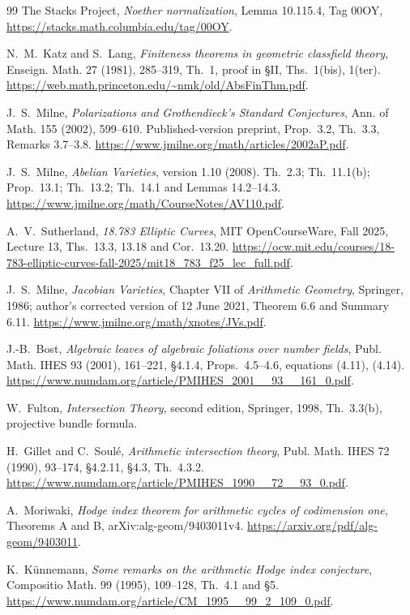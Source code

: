 \documentclass[11pt,a4paper]{article}
\theoremstyle{remark}
\begin{document}
\begin{thebibliography}{99}
The Stacks Project, \emph{Noether normalization}, Lemma 10.115.4,
Tag 00OY, \url{https://stacks.math.columbia.edu/tag/00OY}.

N.~M.~Katz and S.~Lang, \emph{Finiteness theorems in geometric classfield
theory}, Enseign. Math. 27 (1981), 285--319, Th.~1, proof in \S II,
Ths.~1(bis), 1(ter).
\url{https://web.math.princeton.edu/~nmk/old/AbsFinThm.pdf}.

J.~S.~Milne, \emph{Polarizations and Grothendieck's Standard Conjectures},
Ann. of Math. 155 (2002), 599--610. Published-version preprint,
Prop.~3.2, Th.~3.3, Remarks 3.7--3.8.
\url{https://www.jmilne.org/math/articles/2002aP.pdf}.

J.~S.~Milne, \emph{Abelian Varieties}, version 1.10 (2008).
Th.~2.3; Th.~11.1(b); Prop.~13.1; Th.~13.2; Th.~14.1 and
Lemmas 14.2--14.3.
\url{https://www.jmilne.org/math/CourseNotes/AV110.pdf}.

A.~V.~Sutherland, \emph{18.783 Elliptic Curves}, MIT OpenCourseWare,
Fall 2025, Lecture 13, Ths.~13.3, 13.18 and Cor.~13.20.
\url{https://ocw.mit.edu/courses/18-783-elliptic-curves-fall-2025/mit18_783_f25_lec_full.pdf}.

J.~S.~Milne, \emph{Jacobian Varieties}, Chapter VII of
\emph{Arithmetic Geometry}, Springer, 1986; author's corrected version
of 12 June 2021, Theorem 6.6 and Summary 6.11. \url{https://www.jmilne.org/math/xnotes/JVs.pdf}.

J.-B.~Bost, \emph{Algebraic leaves of algebraic foliations over number
fields}, Publ. Math. IHES 93 (2001), 161--221,
\S4.1.4, Props.~4.5--4.6, equations (4.11), (4.14).
\url{https://www.numdam.org/article/PMIHES_2001__93__161_0.pdf}.

W.~Fulton, \emph{Intersection Theory}, second edition, Springer, 1998,
Th.~3.3(b), projective bundle formula.

H.~Gillet and C.~Soul\'e, \emph{Arithmetic intersection theory},
Publ. Math. IHES 72 (1990), 93--174, \S4.2.11, \S4.3,
Th.~4.3.2.
\url{https://www.numdam.org/article/PMIHES_1990__72__93_0.pdf}.

A.~Moriwaki, \emph{Hodge index theorem for arithmetic cycles of
codimension one}, Theorems A and B, arXiv:alg-geom/9403011v4.
\url{https://arxiv.org/pdf/alg-geom/9403011}.

K.~K\"unnemann, \emph{Some remarks on the arithmetic Hodge index
conjecture}, Compositio Math. 99 (1995), 109--128,
Th.~4.1 and \S5.
\url{https://www.numdam.org/article/CM_1995__99_2_109_0.pdf}.


\end{thebibliography}
\end{document}
